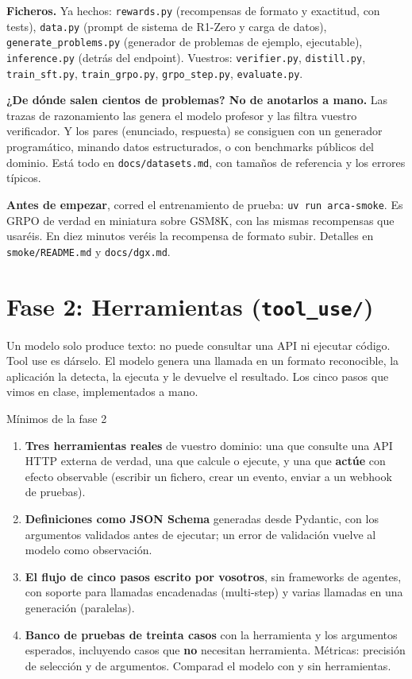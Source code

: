 \documentclass[11pt,a4paper]{article}
\newcommand{\code}[1]{{\small\texttt{#1}}}
\newcommand{\file}[1]{{\small\texttt{\textcolor{arcablue}{#1}}}}
\begin{document}
\textbf{Ficheros.} Ya hechos: \file{rewards.py} (recompensas de formato y exactitud, con
tests), \file{data.py} (prompt de sistema de R1-Zero y carga de datos),
\file{generate\_problems.py} (generador de problemas de ejemplo, ejecutable),
\file{inference.py} (detrás del endpoint). Vuestros: \file{verifier.py}, \file{distill.py},
\file{train\_sft.py}, \file{train\_grpo.py}, \file{grpo\_step.py}, \file{evaluate.py}.

\textbf{¿De dónde salen cientos de problemas? No de anotarlos a mano.} Las trazas de
razonamiento las genera el modelo profesor y las filtra vuestro verificador. Y los pares
(enunciado, respuesta) se consiguen con un generador programático, minando datos
estructurados, o con benchmarks públicos del dominio. Está todo en
\file{docs/datasets.md}, con tamaños de referencia y los errores típicos.

\textbf{Antes de empezar}, corred el entrenamiento de prueba: \code{uv run arca-smoke}. Es
GRPO de verdad en miniatura sobre GSM8K, con las mismas recompensas que usaréis. En diez
minutos veréis la recompensa de formato subir. Detalles en \file{smoke/README.md} y
\file{docs/dgx.md}.

\section{Fase 2: Herramientas (\file{tool\_use/})}

Un modelo solo produce texto: no puede consultar una API ni ejecutar código. Tool use es
dárselo. El modelo genera una llamada en un formato reconocible, la aplicación la detecta, la
ejecuta y le devuelve el resultado. Los cinco pasos que vimos en clase, implementados a mano.

\begin{minimos}{Mínimos de la fase 2}
\begin{enumerate}
  \item \textbf{Tres herramientas reales} de vuestro dominio: una que consulte una API HTTP
  externa de verdad, una que calcule o ejecute, y una que \textbf{actúe} con efecto
  observable (escribir un fichero, crear un evento, enviar a un webhook de pruebas).
  \item \textbf{Definiciones como JSON Schema} generadas desde Pydantic, con los argumentos
  validados antes de ejecutar; un error de validación vuelve al modelo como observación.
  \item \textbf{El flujo de cinco pasos escrito por vosotros}, sin frameworks de agentes, con
  soporte para llamadas encadenadas (multi-step) y varias llamadas en una generación
  (paralelas).
  \item \textbf{Banco de pruebas de treinta casos} con la herramienta y los argumentos
  esperados, incluyendo casos que \textbf{no} necesitan herramienta. Métricas: precisión de
  selección y de argumentos. Comparad el modelo con y sin herramientas.
\end{enumerate}
\end{minimos}
\end{document}

